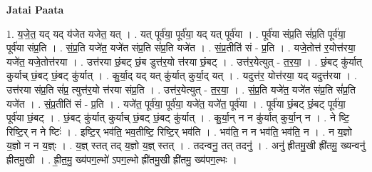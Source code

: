 \documentclass[17pt]{extarticle}
\begin{document}
\textbf{Jatai Paata} \newline

1. य॒जे॒त॒ यद् यद् य॑जेत यजेत॒ यत् । . यत् पूर्व॑या॒ पूर्व॑या॒ यद् यत् पूर्व॑या । . पूर्व॑या संप्र॒ति सं॑प्र॒ति पूर्व॑या॒ पूर्व॑या संप्र॒ति । . सं॒प्र॒ति यजे॑त॒ यजे॑त संप्र॒ति सं॑प्र॒ति यजे॑त । . सं॒प्र॒तीति॑ सं - प्र॒ति । . यजे॒तोत्त॑ र॒योत्त॑रया॒ यजे॑त॒ यजे॒तोत्त॑रया । . उत्त॑रया छं॒बट् छं॒ब डुत्त॑र॒यो त्त॑रया छं॒बट् । . उत्त॑र॒येत्युत् - त॒र॒या॒ । . छं॒बट् कु॑र्यात् कुर्याच् छं॒बट् छं॒बट् कु॑र्यात् । . कु॒र्या॒द् यद् यत् कु॑र्यात् कुर्या॒द् यत् । . यदुत्त॑र॒ योत्त॑रया॒ यद् यदुत्त॑रया । . उत्त॑रया संप्र॒ति सं॑प्र॒ त्युत्त॑र॒यो त्त॑रया संप्र॒ति । . उत्त॑र॒येत्युत् - त॒र॒या॒ । . सं॒प्र॒ति यजे॑त॒ यजे॑त संप्र॒ति सं॑प्र॒ति यजे॑त । . सं॒प्र॒तीति॑ सं - प्र॒ति । . यजे॑त॒ पूर्व॑या॒ पूर्व॑या॒ यजे॑त॒ यजे॑त॒ पूर्व॑या । . पूर्व॑या छं॒बट् छं॒बट् पूर्व॑या॒ पूर्व॑या छं॒बट् । . छं॒बट् कु॑र्यात् कुर्याच् छं॒बट् छं॒बट् कु॑र्यात् । . कु॒र्या॒न् न न कु॑र्यात् कुर्या॒न् न । . ने ष्टि॒ रिष्टि॒र् न ने ष्टिः॑ । . इष्टि॒र् भव॑ति॒ भव॒तीष्टि॒ रिष्टि॒र् भव॑ति । . भव॑ति॒ न न भव॑ति॒ भव॑ति॒ न । . न य॒ज्ञो य॒ज्ञो न न य॒ज्ञ्ः । . य॒ज्ञ् स्तत् तद् य॒ज्ञो य॒ज्ञ् स्तत् । . तदन्वनु॒ तत् तदनु॑ । . अनु॑ ह्रीतमु॒खी ह्री॑तमु॒ ख्यन्वनु॑ ह्रीतमु॒खी । . ह्री॒त॒मु॒ ख्य॑पग॒ल्भो॑ ऽपग॒ल्भो ह्री॑तमु॒खी ह्री॑तमु॒ ख्य॑पग॒ल्भः । \newline
\end{document}
